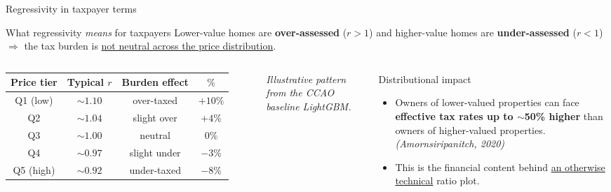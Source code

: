 \documentclass[aspectratio=169,12pt,]{beamer}
\newcommand{\1}{\mathbf{1}}
\begin{document}
\begin{frame}{Regressivity in taxpayer terms}

\begin{block}{ What regressivity \emph{means} for taxpayers}
Lower-value homes are \textbf{over-assessed} ($r>1$) and higher-value homes are \textbf{under-assessed} ($r<1$)
\;\;$\Rightarrow$\;\; the tax burden is \underline{not neutral across the price distribution}.
\end{block}

\medskip

\begin{columns}[T,onlytextwidth]
\centering
\small
\begin{tabular}{c|c|c|c}
\toprule
Price tier & Typical $r$ & Burden effect & $\%$\\
\midrule
\rowcolor{red!10} Q1 (low)   & $\sim 1.10$ & over-taxed   & $+10\%$ \\
 Q2                & $\sim 1.04$ & slight over  & $+4\%$  \\
 Q3                & $\sim 1.00$ & neutral      & 0\% \\
 Q4                & $\sim 0.97$ & slight under & $-3\%$  \\
\rowcolor{green!10} Q5 (high) & $\sim 0.92$ & under-taxed  & $-8\%$  \\
\bottomrule
\end{tabular}

\vspace{2mm}
{\scriptsize\itshape Illustrative pattern from the CCAO baseline LightGBM.}

\begin{block}{ Distributional impact}
\begin{itemize}
    \item Owners of lower-valued properties can face \textbf{effective tax rates up to $\sim$50\% higher} than owners of higher-valued properties.\\[0.5mm]
    {\scriptsize\itshape (Amornsiripanitch, 2020)}
    \smallskip
    \item This is the financial content behind \underline{an otherwise technical} ratio plot.
\end{itemize}
\end{block}
\end{columns}

\end{frame}
\end{document}
